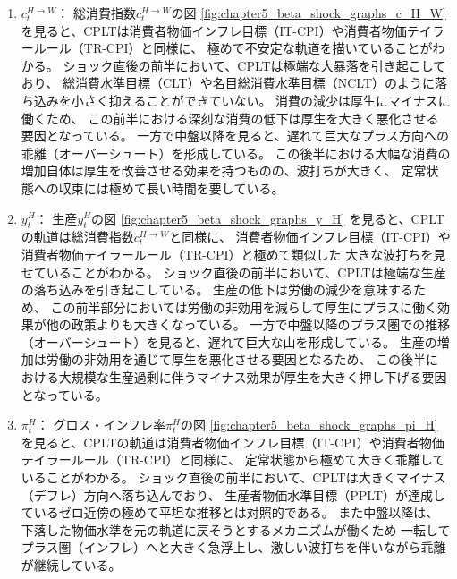 \begin{enumerate}
    \item
    \label{itm:chapter5_beta_shock_policies_cplt_c_H_W}
        \(c_t^{H\to W}\)：
        総消費指数\(c_t^{H\to W}\)の図
        \ref{fig:chapter5_beta_shock_graphs_c_H_W}
        を見ると、CPLTは消費者物価インフレ目標（IT-CPI）や消費者物価テイラールール（TR-CPI）と同様に、
        極めて不安定な軌道を描いていることがわかる。
        ショック直後の前半において、CPLTは極端な大暴落を引き起こしており、
        総消費水準目標（CLT）や名目総消費水準目標（NCLT）のように落ち込みを小さく抑えることができていない。
        消費の減少は厚生にマイナスに働くため、
        この前半における深刻な消費の低下は厚生を大きく悪化させる要因となっている。
        一方で中盤以降を見ると、遅れて巨大なプラス方向への乖離（オーバーシュート）を形成している。
        この後半における大幅な消費の増加自体は厚生を改善させる効果を持つものの、波打ちが大きく、
        定常状態への収束には極めて長い時間を要している。
    \item
    \label{itm:chapter5_beta_shock_policies_cplt_y_H}
        \(y_t^H\)：
        生産\(y_t^H\)の図
        \ref{fig:chapter5_beta_shock_graphs_y_H}
        を見ると、CPLTの軌道は総消費指数\(c_t^{H\to W}\)と同様に、
        消費者物価インフレ目標（IT-CPI）や消費者物価テイラールール（TR-CPI）と極めて類似した
        大きな波打ちを見せていることがわかる。
        ショック直後の前半において、CPLTは極端な生産の落ち込みを引き起こしている。
        生産の低下は労働の減少を意味するため、
        この前半部分においては労働の非効用を減らして厚生にプラスに働く効果が他の政策よりも大きくなっている。
        一方で中盤以降のプラス圏での推移（オーバーシュート）を見ると、遅れて巨大な山を形成している。
        生産の増加は労働の非効用を通じて厚生を悪化させる要因となるため、
        この後半における大規模な生産過剰に伴うマイナス効果が厚生を大きく押し下げる要因となっている。
    \item
    \label{itm:chapter5_beta_shock_policies_cplt_pi_H}
        \(\pi_t^H\)：
        グロス・インフレ率\(\pi_t^H\)の図
        \ref{fig:chapter5_beta_shock_graphs_pi_H}
        を見ると、CPLTの軌道は消費者物価インフレ目標（IT-CPI）や消費者物価テイラールール（TR-CPI）と同様に、
        定常状態から極めて大きく乖離していることがわかる。
        ショック直後の前半において、CPLTは大きくマイナス（デフレ）方向へ落ち込んでおり、
        生産者物価水準目標（PPLT）が達成しているゼロ近傍の極めて平坦な推移とは対照的である。
        また中盤以降は、下落した物価水準を元の軌道に戻そうとするメカニズムが働くため
        一転してプラス圏（インフレ）へと大きく急浮上し、激しい波打ちを伴いながら乖離が継続している。

\end{enumerate}
